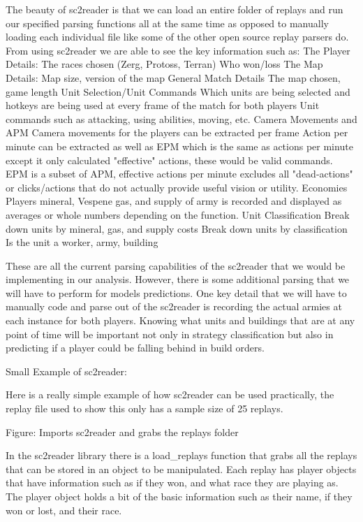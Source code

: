 \documentclass[a4paper,12pt]{report}
\begin{document}
The beauty of sc2reader is that we can load an entire folder of replays and run our specified parsing functions all at the same time as opposed to manually loading each individual file like some of the other open source replay parsers do.
From using sc2reader we are able to see the key information such as:
The Player Details:
The races chosen (Zerg, Protoss, Terran)
Who won/loss
The Map Details:
Map size, version of the map
 General Match Details
The map chosen, game length
Unit Selection/Unit Commands
Which units are being selected and hotkeys are being used at every frame of the match for both players
Unit commands such as attacking, using abilities, moving, etc.
Camera Movements and APM
 Camera movements for the players can be extracted per frame
Action per minute can be extracted as well as EPM which is the same as actions per minute except it only calculated "effective" actions, these would be valid commands.
EPM is a subset of APM, effective actions per minute excludes all "dead-actions" or clicks/actions that do not actually provide useful vision or utility.
 Economies
Players mineral, Vespene gas, and supply of army is recorded and displayed as averages or whole numbers depending on the function. 
 Unit Classification
Break down units by mineral, gas, and supply costs
 Break down units by classification
Is the unit a worker, army, building

These are all the current parsing capabilities of the sc2reader that we would be implementing in our analysis. However, there is some additional parsing that we will have to perform for models predictions. One key detail that we will have to manually code and parse out of the sc2reader is recording the actual armies at each instance for both players. Knowing what units and buildings that are at any point of time will be important not only in strategy classification but also in predicting if a player could be falling behind in build orders.


Small Example of sc2reader:

Here is a really simple example of how sc2reader can be used practically, the replay file used to show this only has a sample size of 25 replays.

Figure: Imports sc2reader and grabs the replays folder

In the sc2reader library there is a load\_replays function that grabs all the replays that can be stored in an object to be manipulated. Each replay has player objects that have information such as if they won, and what race they are playing as. The player object holds a bit of the basic information such as their name, if they won or lost, and their race. 
\end{document}
